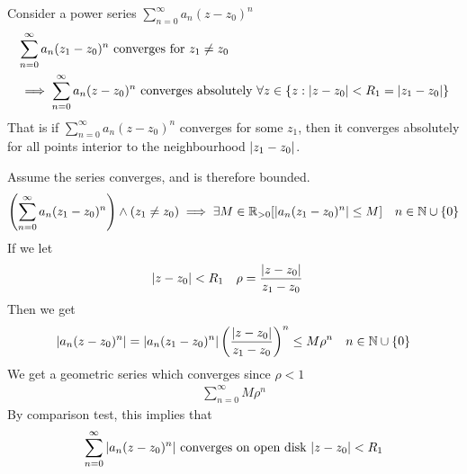 \documentclass[12pt, english]{book}
\makeatletter
\renewenvironment{proof}[1][\proofname]{\par
	\pushQED{\qed}%
	\normalfont \topsep6\p@\@plus6\p@\relax
	\list{}{%
		\settowidth{\leftmargin}{\itshape\proofname:\hskip\labelsep}%
		\setlength{\labelwidth}{0pt}%
		\setlength{\itemindent}{-\leftmargin}%
	}%
	\item[\hskip\labelsep\itshape#1\@addpunct{:}]\ignorespaces
	}{ \popQED\endlist\@endpefalse}
\makeatother
\begin{document}
	\begin{theorem}
		\label{Absolute Convergence of Power Series Theorem - Complex}
		Consider a power series \(\sum_{n=0}^{\infty} a_n (z-z_0)^n\)
		\begin{align*}
			&\sum_{n=0}^{\infty} a_n (z_1-z_0)^n \text{ converges for } z_1 \neq  z_0 \\ &\implies \sum_{n=0}^{\infty} a_n (z-z_0)^n \text{ converges absolutely } \forall z \in \{z : \abs{z-z_0}< R_1 = \abs{z_1 - z_0}\}
		\end{align*}
		That is if \(\sum_{n=0}^{\infty} a_n (z-z_0)^n\) converges for some \(z_1\), then it converges absolutely for all points interior to the neighbourhood \(\abs{z_1 - z_0}\).
	\end{theorem}
	\begin{proof}
		Assume the series converges, and is therefore bounded.
		\begin{align*}
			\left( \sum_{n=0}^{\infty} a_n (z_1 - z_0)^n \right) \land (z_1 \neq z_0) &\implies \exists M\in \mathbb{R}_{>0} [\abs{a_n (z_1 - z_0)^n}\leq M]	
				& n \in \mathbb{N}\cup \{0\}
		\end{align*}
		If we let
		\begin{align*}
			\abs{z-z_0} &< R_1 & \rho &= \frac{\abs{z-z_0}}{z_1 - z_0}
		\end{align*}
		Then we get 
		\begin{align*}
			\abs{a_n(z-z_0)^n} 
			&= \abs{a_n (z_1 - z_0)^n} \left(\frac{\abs{z-z_0}}{z_1 - z_0}\right)^n \leq M\rho^n
				& n \in \mathbb{N} \cup \{0\}
		\end{align*}
		We get a geometric series which converges since \(\rho<1\)
		\begin{align*}
			\sum_{n=0}^{\infty} M \rho^n
		\end{align*}
		By comparison test, this implies that 
		\begin{align*}
			\sum_{n=0}^{\infty} \abs{a_n (z-z_0)^n} \text{ converges on open disk } \abs{z-z_0}<R_1
		\end{align*}
	\end{proof}
\end{document}
